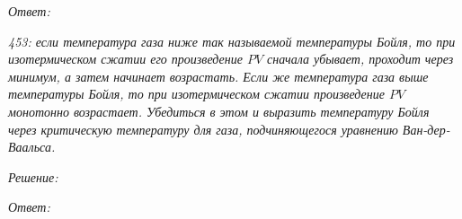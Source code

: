 \vspace*{2em}
\emph{Ответ:}

\newpage %

\emph{453: если температура газа ниже так называемой температуры Бойля, то при
изотермическом сжатии его произведение \( PV \) сначала убывает, проходит через
минимум, а затем начинает возрастать. Если же температура газа выше температуры
Бойля, то при изотермическом сжатии произведение \( PV \) монотонно возрастает.
Убедиться в этом и выразить температуру Бойля через критическую температуру для
газа, подчиняющегося уравнению Ван-дер-Ваальса.}

\vspace*{2em}
\emph{Решение:}

\vspace*{2em}
\emph{Ответ:}


